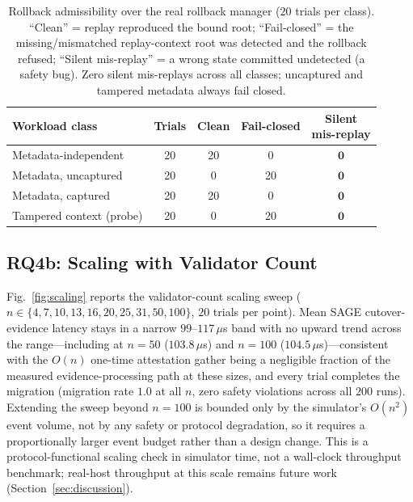 \documentclass[journal]{IEEEtran}
\theoremstyle{definition}
\theoremstyle{remark}
\begin{document}
\begin{table}[t]
\centering
\caption{Rollback admissibility over the real rollback manager ($20$ trials per class). ``Clean''
= replay reproduced the bound root; ``Fail-closed'' = the missing/mismatched replay-context root
was detected and the rollback refused; ``Silent mis-replay'' = a wrong state committed undetected
(a safety bug). Zero silent mis-replays across all classes; uncaptured and tampered metadata always
fail closed.}
\label{tab:rollbackadm}
\setlength{\tabcolsep}{5pt}
\renewcommand{\arraystretch}{1.2}
\footnotesize
\begin{tabular}{lcccc}
\toprule
Workload class & Trials & Clean & Fail-closed & \makecell{Silent\\mis-replay} \\
\midrule
Metadata-independent      & 20 & 20 & 0  & $\mathbf{0}$ \\
Metadata, uncaptured      & 20 & 0  & 20 & $\mathbf{0}$ \\
Metadata, captured        & 20 & 20 & 0  & $\mathbf{0}$ \\
Tampered context (probe)  & 20 & 0  & 20 & $\mathbf{0}$ \\
\bottomrule
\end{tabular}
\end{table}

\subsection{RQ4b: Scaling with Validator Count}
Fig.~\ref{fig:scaling} reports the validator-count scaling sweep
($n\in\{4,7,10,13,16,20,25,31,50,100\}$, $20$ trials per point). Mean
SAGE cutover-evidence latency stays in a narrow $99$--$117\,\mu$s band with no upward trend across
the range---including at $n{=}50$ ($103.8\,\mu$s) and $n{=}100$ ($104.5\,\mu$s)---consistent with
the $O(n)$ one-time attestation gather being a negligible fraction of
the measured evidence-processing path at these sizes, and every trial completes the migration
(migration rate $1.0$ at all $n$, zero safety violations across all $200$ runs). Extending the
sweep beyond $n{=}100$ is bounded only by the simulator's $O(n^2)$ event volume, not by any
safety or protocol degradation, so it requires a proportionally larger event budget rather than a
design change. This is a protocol-functional scaling check in simulator time,
not a wall-clock throughput benchmark; real-host throughput at this scale
remains future work (Section~\ref{sec:discussion}).
\end{document}

